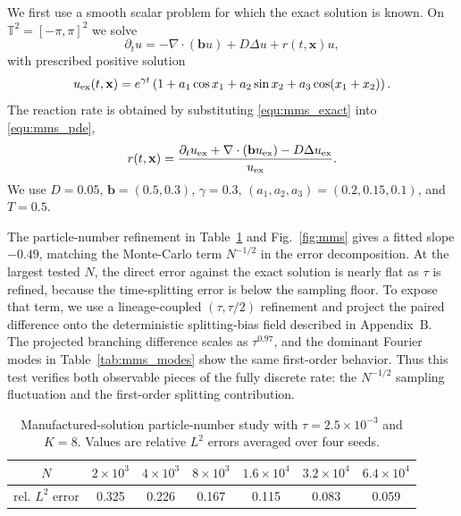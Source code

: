 \documentclass[a4paper,fleqn]{cas-sc}
\theoremstyle{definition}
\theoremstyle{remark}
\begin{document}
We first use a smooth scalar problem for which the exact solution is known.  On $\mathbb T^2=[-\pi,\pi]^2$ we solve
\begin{equation}
\partial_t u=-\nabla\cdot(\mathbf b u)+D\Delta u+r(t,\mathbf x)u,
\label{equ:mms_pde}
\end{equation}
with prescribed positive solution
\begin{equation}
 u_{\rm ex}(t,\mathbf x)=e^{\gamma t}\left(1+a_1\cos x_1+a_2\sin x_2+a_3\cos(x_1+x_2)\right).
\label{equ:mms_exact}
\end{equation}
The reaction rate is obtained by substituting \eqref{equ:mms_exact} into \eqref{equ:mms_pde},
\begin{equation}
 r(t,\mathbf x)=\frac{\partial_t u_{\rm ex}+\nabla\cdot(\mathbf b u_{\rm ex})-D\Delta u_{\rm ex}}{u_{\rm ex}}.
\label{equ:mms_r}
\end{equation}
We use $D=0.05$, $\mathbf b=(0.5,0.3)$, $\gamma=0.3$, $(a_1,a_2,a_3)=(0.2,0.15,0.1)$, and $T=0.5$.

The particle-number refinement in Table~\ref{tab:mms_N} and Fig.~\ref{fig:mms} gives a fitted slope $-0.49$, matching the Monte-Carlo term $N^{-1/2}$ in the error decomposition.  At the largest tested $N$, the direct error against the exact solution is nearly flat as $\tau$ is refined, because the time-splitting error is below the sampling floor.  To expose that term, we use a lineage-coupled $(\tau,\tau/2)$ refinement and project the paired difference onto the deterministic splitting-bias field described in Appendix~B.  The projected branching difference scales as $\tau^{0.97}$, and the dominant Fourier modes in Table~\ref{tab:mms_modes} show the same first-order behavior.  Thus this test verifies both observable pieces of the fully discrete rate: the $N^{-1/2}$ sampling fluctuation and the first-order splitting contribution.

\begin{table}[t]
\centering
\caption{Manufactured-solution particle-number study with $\tau=2.5\times10^{-3}$ and $K=8$.  Values are relative $L^2$ errors averaged over four seeds.}
\label{tab:mms_N}
\begin{tabular}{c c c c c c c}
\toprule
$N$ & $2\times10^3$ & $4\times10^3$ & $8\times10^3$ & $1.6\times10^4$ & $3.2\times10^4$ & $6.4\times10^4$ \\
\midrule
rel. $L^2$ error & 0.325 & 0.226 & 0.167 & 0.115 & 0.083 & 0.059 \\
\bottomrule
\end{tabular}
\end{table}
\end{document}
